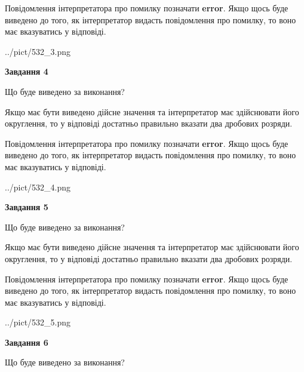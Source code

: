 \documentclass[12pt, ukrainian]{article}
\begin{document}
{\begin {Large}
Повідомлення інтерпретатора про помилку позначати \textbf{error}.
Якщо щось буде виведено до того, як інтерпретатор видасть повідомлення про помилку, 
то воно має вказуватись у відповіді. \par

\begin{center}
	{../pict/532_3.png}
\end{center}
\newpage

{\begin {center}\textbf{Завдання 4}\end {center}}\par
Що буде виведено за виконання? \par

Якщо має бути виведено дійсне значення та інтерпретатор має здійснювати його округлення, 
то у відповіді достатньо правильно вказати два дробових розряди.

Повідомлення інтерпретатора про помилку позначати \textbf{error}.
Якщо щось буде виведено до того, як інтерпретатор видасть повідомлення про помилку, 
то воно має вказуватись у відповіді. \par

\begin{center}
	{../pict/532_4.png}
\end{center}
\newpage

{\begin {center}\textbf{Завдання 5}\end {center}}\par
Що буде виведено за виконання? \par

Якщо має бути виведено дійсне значення та інтерпретатор має здійснювати його округлення, 
то у відповіді достатньо правильно вказати два дробових розряди.

Повідомлення інтерпретатора про помилку позначати \textbf{error}.
Якщо щось буде виведено до того, як інтерпретатор видасть повідомлення про помилку, 
то воно має вказуватись у відповіді. \par

\begin{center}
	{../pict/532_5.png}
\end{center}
\newpage

{\begin {center}\textbf{Завдання 6}\end {center}}\par
Що буде виведено за виконання? \par


\end{Large}}
\end{document}
